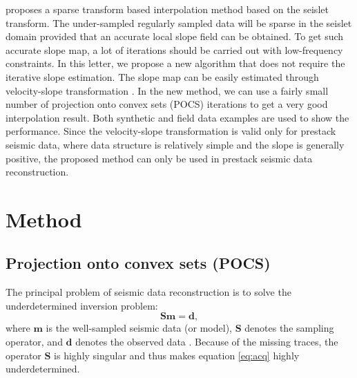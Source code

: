 \cite{shuwei20153} proposes a sparse transform based interpolation method based on the seislet transform. The under-sampled regularly sampled data will be sparse in the seislet domain provided that an accurate local slope field can be obtained. To get such accurate slope map, a lot of iterations should be carried out with low-frequency constraints. In this letter, we propose a new algorithm that does not require the iterative slope estimation. The slope map can be easily estimated through velocity-slope transformation \cite{liuyang2013}. In the new method, we can use a fairly small number of projection onto convex sets (POCS) iterations to get a very good interpolation result. Both synthetic and field data examples are used to show the performance. Since the velocity-slope transformation is valid only for prestack seismic data, where data structure is relatively simple and the slope is generally positive, the proposed method can only be used in prestack seismic data reconstruction. 


\section{Method}
\subsection{Projection onto convex sets (POCS)}
The principal problem of seismic data reconstruction is to solve the underdetermined inversion problem:
\begin{equation}
\label{eq:acq}
\mathbf{Sm}=\mathbf{d},
\end{equation}
where $\mathbf{m}$ is the well-sampled seismic data (or model), $\mathbf{S}$ denotes the sampling operator, and $\mathbf{d}$ denotes the observed data \cite{yangkang2014halfthr}. Because of the missing traces, the operator $\mathbf{S}$ is highly singular and thus makes equation \ref{eq:acq} highly underdetermined.

